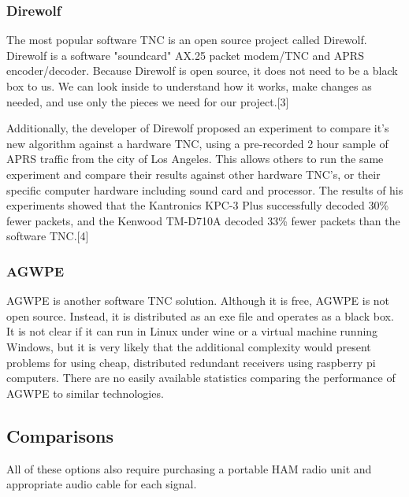\documentclass[onecolumn, draftclsnofoot, 10pt, compsoc]{IEEEtran}
\begin{document}
\subsubsection{Direwolf}
The most popular software TNC is an open source project called Direwolf.  Direwolf is a software "soundcard" AX.25 packet modem/TNC and APRS encoder/decoder.  Because Direwolf is open source, it does not need to be a black box to us.  We can look inside to understand how it works, make changes as needed, and use only the pieces we need for our project.[3]

Additionally, the developer of Direwolf proposed an experiment to compare it's new algorithm against a hardware TNC, using a pre-recorded 2 hour sample of APRS traffic from the city of Los Angeles.  This allows others to run the same experiment and compare their results against other hardware TNC's, or their specific computer hardware including sound card and processor.  The results of his experiments showed that the Kantronics KPC-3 Plus successfully decoded 30\% fewer packets, and the Kenwood TM-D710A decoded 33\% fewer packets than the software TNC.[4]

\subsubsection{AGWPE}
AGWPE is another software TNC solution.  Although it is free, AGWPE is not open source.  Instead, it is distributed as an exe file and operates as a black box.  It is not clear if it can run in Linux under wine or a virtual machine running Windows, but it is very likely that the additional complexity would present problems for using cheap, distributed redundant receivers using raspberry pi computers.  There are no easily available statistics comparing the performance of AGWPE to similar technologies.

\subsection{Comparisons}
All of these options also require purchasing a portable HAM radio unit and appropriate audio cable for each signal.

\begin{center}
\end{center}
\end{document}
